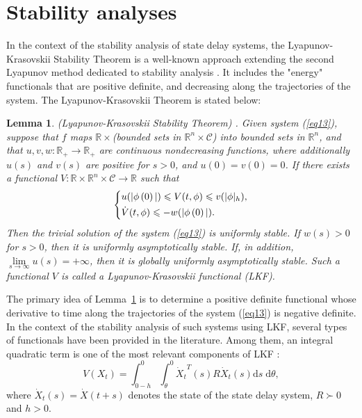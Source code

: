 \documentclass[a4paper]{cas-sc}
\newtheorem{lemma}[theorem]{Lemma}
\begin{document}
\section{Stability analyses}
\label{Section 4}

In the context of the stability analysis of state delay systems, the Lyapunov-Krasovskii Stability Theorem is a well-known approach extending the second Lyapunov method dedicated to stability analysis \citep{Gu2003}. It includes the "energy" functionals that are positive definite, and decreasing along the trajectories of the system. The Lyapunov-Krasovskii Theorem is stated below:
\begin{lemma}
  \label{lemma3}
  (Lyapunov-Krasovskii Stability Theorem) \citep{Gu2009}. Given system (\ref{eq13}), suppose that $f$ maps $\mathbb{R} \times  $(bounded sets in ${\mathbb{R}^n} \times \mathcal{C} $) into bounded sets in ${\mathbb{R}^n} $, and that $u,v,w:{\mathbb{R}_ + } \to {\mathbb{R}_ + } $ are continuous nondecreasing functions, where additionally $u(s) $ and $v(s) $ are positive for $s > 0 $, and $u(0) = v(0) = 0 $. If there exists a functional $V:\mathbb{R} \times {\mathbb{R}^n} \times \mathcal{C} \to \mathbb{R} $ such that
  \begin{equation}
    \left\{ \begin{gathered}
      u(|\phi \left( 0 \right)|) \leqslant V(t,\phi ) \leqslant v(|\phi {|_h}) \hfill, \\
      \dot V(t,\phi ) \leqslant  - w(|\phi \left( 0 \right)|). \hfill \\
    \end{gathered}  \right.
    \label{eq15}
  \end{equation}
  Then the trivial solution of the system (\ref{eq13}) is uniformly stable. If $w(s) > 0 $ for $s > 0 $, then it is uniformly asymptotically stable. If, in addition, $\mathop {\lim }\limits_{s \to \infty } u(s) =  + \infty  $, then it is globally uniformly asymptotically stable. Such a functional $V $ is called a Lyapunov-Krasovskii functional (LKF).
\end{lemma}

The primary idea of Lemma~\ref{lemma3} is to determine a positive definite functional whose derivative to time along the trajectories of the system (\ref{eq13}) is negative definite. In the context of the stability analysis of such systems using LKF, several types of functionals have been provided in the literature. Among them, an integral quadratic term is one of the most relevant components of LKF \citep{pepe_lyapunovkrasovskii_2006}:
\begin{equation}
  V\left( {{X_t}} \right) = \int_{0 - h}^0 {\int_\theta ^0 {{{\dot X}_t}^T(s)R{{\dot X}_t}(s){\text{d}}s\;{\text{d}}\theta } },
  \label{eq16}
\end{equation}
where $ {\dot X_t}(s) = {\dot X}(t + s) $ denotes the state of the state delay system, $ R \succ 0 $ and $ h > 0 $.
\end{document}
